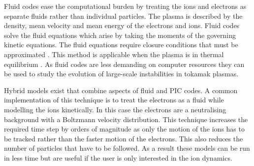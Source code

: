 
Fluid codes ease the computational burden by treating the ions and electrons as separate fluids rather than individual particles. The plasma is described by the density, mean velocity and mean energy of the electrons and ions.  Fluid codes solve the fluid equations which arise by taking the moments of the governing kinetic equations. The fluid equations require closure conditions that must be approximated \cite{fluid_closure}. This method is applicable when the plasma is in thermal equilibrium \cite{sturrock1994plasma}. As fluid codes are less demanding on computer resources they can be used to study the evolution of large-scale instabilities in tokamak plasmas.


Hybrid models exist that combine aspects of fluid and PIC codes. A common implementation of this technique is to treat the electrons as a fluid while modelling the ions kinetically. In this case the electrons are a neutralising background with a Boltzmann velocity distribution. This technique increases the required time step  by orders of magnitude as only the motion of the ions has to be tracked rather than the faster motion of the electrons. This also reduces the number of particles that have to be followed.  As a result these models can be run in less time but are useful if the user is only interested in the ion dynamics. 



